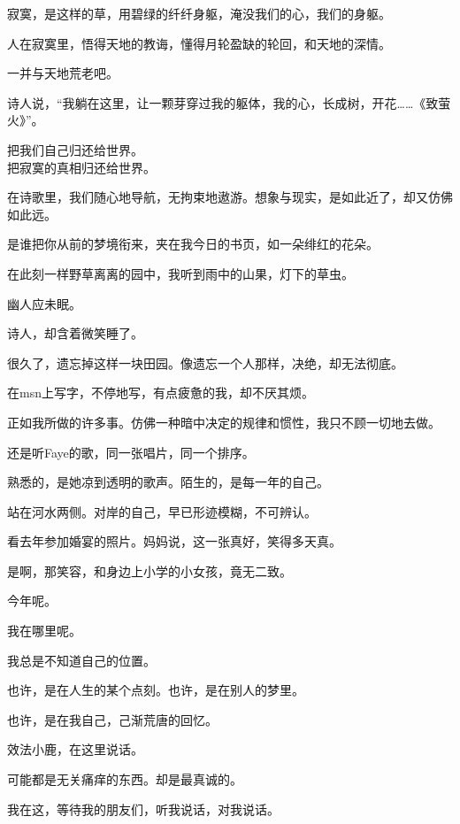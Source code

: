 \documentclass[12pt,a4paper]{article}
\def\blankrev{\vspace{1ex}}									%
\begin{document}
		\blankrev
		寂寞，是这样的草，用碧绿的纤纤身躯，淹没我们的心，我们的身躯。\par
		人在寂寞里，悟得天地的教诲，懂得月轮盈缺的轮回，和天地的深情。\par
		一并与天地荒老吧。\par
		诗人说，“我躺在这里，让一颗芽穿过我的躯体，我的心，长成树，开花……《致萤火》”。

		\longpoem{}{}{}
		把我们自己归还给世界。\\
		把寂寞的真相归还给世界。
		\endlongpoem

		在诗歌里，我们随心地导航，无拘束地遨游。想象与现实，是如此近了，却又仿佛如此远。

		\blankrev
		是谁把你从前的梦境衔来，夹在我今日的书页，如一朵绯红的花朵。\par
		在此刻一样野草离离的园中，我听到雨中的山果，灯下的草虫。\par
		幽人应未眠。\par
		诗人，却含着微笑睡了。

	\endwriting



		很久了，遗忘掉这样一块田园。像遗忘一个人那样，决绝，却无法彻底。\par
		在msn上写字，不停地写，有点疲惫的我，却不厌其烦。\par
		正如我所做的许多事。仿佛一种暗中决定的规律和惯性，我只不顾一切地去做。\par
		还是听Faye的歌，同一张唱片，同一个排序。\par
		熟悉的，是她凉到透明的歌声。陌生的，是每一年的自己。\par
		站在河水两侧。对岸的自己，早已形迹模糊，不可辨认。\par
		看去年参加婚宴的照片。妈妈说，这一张真好，笑得多天真。\par
		是啊，那笑容，和身边上小学的小女孩，竟无二致。\par
		今年呢。\par
		我在哪里呢。\par
		我总是不知道自己的位置。\par
		也许，是在人生的某个点刻。也许，是在别人的梦里。\par
		也许，是在我自己，己渐荒唐的回忆。

		\blankrev
		效法小鹿，在这里说话。\par
		可能都是无关痛痒的东西。却是最真诚的。

		我在这，等待我的朋友们，听我说话，对我说话。
\end{document}
